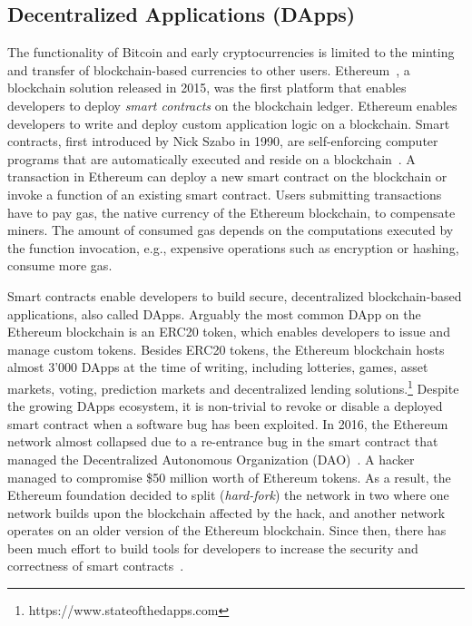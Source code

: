 \subsection{Decentralized Applications (DApps)}
The functionality of Bitcoin and early cryptocurrencies is limited to the minting and transfer of blockchain-based currencies to other users.
Ethereum~\cite{wood2014ethereum}, a blockchain solution released in 2015, was the first platform that enables developers to deploy \emph{smart contracts} on the blockchain ledger.
Ethereum enables developers to write and deploy custom application logic on a blockchain.
Smart contracts, first introduced by Nick Szabo in 1990, are self-enforcing computer programs that are automatically executed and reside on a blockchain~\cite{szabo1996smart}.
A transaction in Ethereum can deploy a new smart contract on the blockchain or invoke a function of an existing smart contract.
Users submitting transactions have to pay gas, the native currency of the Ethereum blockchain, to compensate miners.
The amount of consumed gas depends on the computations executed by the function invocation, e.g., expensive operations such as encryption or hashing, consume more gas.


Smart contracts enable developers to build secure, decentralized blockchain-based applications, also called DApps.
Arguably the most common DApp on the Ethereum blockchain is an ERC20 token, which enables developers to issue and manage custom tokens.
Besides ERC20 tokens, the Ethereum blockchain hosts almost 3'000 DApps at the time of writing, including lotteries, games, asset markets, voting, prediction markets and decentralized lending solutions.\footnote{https://www.stateofthedapps.com}
Despite the growing DApps ecosystem, it is non-trivial to revoke or disable a deployed smart contract when a software bug has been exploited.
In 2016, the Ethereum network almost collapsed due to a re-entrance bug in the smart contract that managed the Decentralized Autonomous Organization (DAO)~\cite{mehar2019understanding}.
A hacker managed to compromise \$50 million worth of Ethereum tokens.
As a result, the Ethereum foundation decided to split (\emph{hard-fork}) the network in two where one network builds upon the blockchain affected by the hack, and another network operates on an older version of the Ethereum blockchain.
Since then, there has been much effort to build tools for developers to increase the security and correctness of smart contracts~\cite{breidenbach2018enter}.

